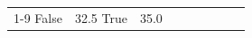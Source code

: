 \begin{table}[H]
\begin{tabular}{lllrlllll}
\cline{1-9}
False & 32.5%
\cline{1-9}
True & 35.0%

\end{tabular}
\end{table}
